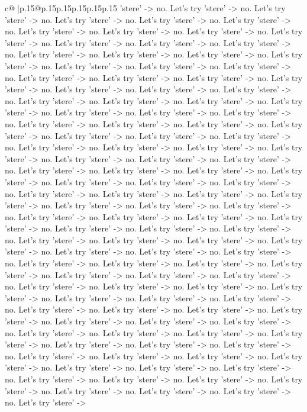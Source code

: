 \documentclass{article}
\begin{document}
{\begin{supertabular}{c@{$\;$}|p{.15\linewidth}@{}p{.15\linewidth}p{.15\linewidth}p{.15\linewidth}p{.15\linewidth}p{.15\linewidth}}
{{{'stere' {-}> no. Let's try 'stere' {-}> no. Let's try 'stere' {-}> no. Let's try 'stere' {-}> no. Let's try 'stere' {-}> no. Let's try 'stere' {-}> no. Let's try 'stere' {-}> no. Let's try 'stere' {-}> no. Let's try 'stere' {-}> no. Let's try 'stere' {-}> no. Let's try 'stere' {-}> no. Let's try 'stere' {-}> no. Let's try 'stere' {-}> no. Let's try 'stere' {-}> no. Let's try 'stere' {-}> no. Let's try 'stere' {-}> no. Let's try 'stere' {-}> no. Let's try 'stere' {-}> no. Let's try 'stere' {-}> no. Let's try 'stere' {-}> no. Let's try 'stere' {-}> no. Let's try 'stere' {-}> no. Let's try 'stere' {-}> no. Let's try 'stere' {-}> no. Let's try 'stere' {-}> no. Let's try 'stere' {-}> no. Let's try 'stere' {-}> no. Let's try 'stere' {-}> no. Let's try 'stere' {-}> no. Let's try 'stere' {-}> no. Let's try 'stere' {-}> no. Let's try 'stere' {-}> no. Let's try 'stere' {-}> no. Let's try 'stere' {-}> no. Let's try 'stere' {-}> no. Let's try 'stere' {-}> no. Let's try 'stere' {-}> no. Let's try 'stere' {-}> no. Let's try 'stere' {-}> no. Let's try 'stere' {-}> no. Let's try 'stere' {-}> no. Let's try 'stere' {-}> no. Let's try 'stere' {-}> no. Let's try 'stere' {-}> no. Let's try 'stere' {-}> no. Let's try 'stere' {-}> no. Let's try 'stere' {-}> no. Let's try 'stere' {-}> no. Let's try 'stere' {-}> no. Let's try 'stere' {-}> no. Let's try 'stere' {-}> no. Let's try 'stere' {-}> no. Let's try 'stere' {-}> no. Let's try 'stere' {-}> no. Let's try 'stere' {-}> no. Let's try 'stere' {-}> no. Let's try 'stere' {-}> no. Let's try 'stere' {-}> no. Let's try 'stere' {-}> no. Let's try 'stere' {-}> no. Let's try 'stere' {-}> no. Let's try 'stere' {-}> no. Let's try 'stere' {-}> no. Let's try 'stere' {-}> no. Let's try 'stere' {-}> no. Let's try 'stere' {-}> no. Let's try 'stere' {-}> no. Let's try 'stere' {-}> no. Let's try 'stere' {-}> no. Let's try 'stere' {-}> no. Let's try 'stere' {-}> no. Let's try 'stere' {-}> no. Let's try 'stere' {-}> no. Let's try 'stere' {-}> no. Let's try 'stere' {-}> no. Let's try 'stere' {-}> no. Let's try 'stere' {-}> no. Let's try 'stere' {-}> no. Let's try 'stere' {-}> no. Let's try 'stere' {-}> no. Let's try 'stere' {-}> no. Let's try 'stere' {-}> no. Let's try 'stere' {-}> no. Let's try 'stere' {-}> no. Let's try 'stere' {-}> no. Let's try 'stere' {-}> no. Let's try 'stere' {-}> no. Let's try 'stere' {-}> no. Let's try 'stere' {-}> no. Let's try 'stere' {-}> no. Let's try 'stere' {-}> no. Let's try 'stere' {-}> no. Let's try 'stere' {-}> no. Let's try 'stere' {-}> no. Let's try 'stere' {-}> no. Let's try 'stere' {-}> no. Let's try 'stere' {-}> no. Let's try 'stere' {-}> no. Let's try 'stere' {-}> no. Let's try 'stere' {-}> no. Let's try 'stere' {-}> no. Let's try 'stere' {-}> no. Let's try 'stere' {-}> no. Let's try 'stere' {-}> no. Let's try 'stere' {-}> no. Let's try 'stere' {-}> no. Let's try 'stere' {-}> no. Let's try 'stere' {-}> no. Let's try 'stere' {-}> no. Let's try 'stere' {-}> no. Let's try 'stere' {-}> no. Let's try 'stere' {-}> no. Let's try 'stere' {-}> no. Let's try 'stere' {-}> no. Let's try 'stere' {-}> no. Let's try 'stere' {-}> no. Let's try 'stere' {-}> no. Let's try 'stere' {-}> no. Let's try 'stere' {-}> }}}
\end{supertabular}}
\end{document}
